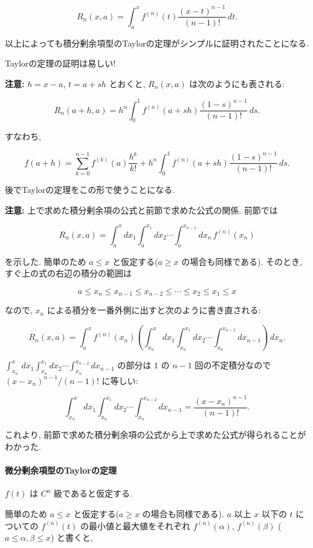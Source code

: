 \documentclass[
  letterpaper,
  DIV=11,
  numbers=noendperiod]{scrartcl}
\let\oldparagraph\paragraph
\renewcommand{\paragraph}[1]{\oldparagraph{#1}\mbox{}}
\begin{document}
\[
R_n(x,a) = \int_a^x f^{(n)}(t)\frac{(x-t)^{n-1}}{(n-1)!}\,dt.
\]

以上によっても積分剰余項型のTaylorの定理がシンプルに証明されたことになる.

Taylorの定理の証明は易しい!

\textbf{注意:} \(h = x - a\), \(t = a + sh\) とおくと, \(R_n(x,a)\)
は次のようにも表される:

\[
R_n(a+h, a) = h^n\int_0^1 f^{(n)}(a + sh)\frac{(1-s)^{n-1}}{(n-1)!}\,ds.
\]

すなわち,

\[
f(a+h) =
\sum_{k=0}^{n-1} f^{(k)}(a)\frac{h^k}{k!} +
h^n\int_0^1 f^{(n)}(a + sh)\frac{(1-s)^{n-1}}{(n-1)!}\,ds.
\]

後でTaylorの定理をこの形で使うことになる.

\textbf{注意:} 上で求めた積分剰余項の公式と前節で求めた公式の関係.
前節では

\[
R_n(x, a) = \int_a^x dx_1\int_a^{x_1}dx_2\cdots\int_a^{x_{n-1}}dx_n\, f^{(n)}(x_n)
\]

を示した. 簡単のため \(a\le x\) と仮定する(\(a \ge x\)
の場合も同様である). そのとき, すぐ上の式の右辺の積分の範囲は

\[
a \le x_n \le x_{n-1}\le x_{n-2}\le\cdots\le x_2 \le x_1 \le x
\]

なので, \(x_n\) による積分を一番外側に出すと次のように書き直される:

\[
R_n(x, a) =
\int_a^x f^{(n)}(x_n)
\left(
\int_{x_n}^x\,dx_1\int_{x_n}^{x_1}dx_2\cdots\int_{x_n}^{x_{n-2}}dx_{n-1}
\right)\,dx_n.
\]

\(\int_{x_n}^x\,dx_1\int_{x_n}^{x_1}dx_2\cdots\int_{x_n}^{x_{n-2}}dx_{n-1}\)
の部分は \(1\) の \(n-1\) 回の不定積分なので \((x-x_n)^{n-1}/(n-1)!\)
に等しい:

\[
\int_{x_n}^x\,dx_1\int_{x_n}^{x_1}dx_2\cdots\int_{x_n}^{x_{n-2}}dx_{n-1} =
\frac{(x-x_n)^{n-1}}{(n-1)!}.
\]

これより,
前節で求めた積分剰余項の公式から上で求めた公式が得られることがわかった.

\hypertarget{ux5faeux5206ux5270ux4f59ux9805ux578bux306etaylorux306eux5b9aux7406}{%
\paragraph{微分剰余項型のTaylorの定理}\label{ux5faeux5206ux5270ux4f59ux9805ux578bux306etaylorux306eux5b9aux7406}}

\(f(t)\) は \(C^n\) 級であると仮定する.

簡単のため \(a\le x\) と仮定する(\(a\ge x\) の場合も同様である). \(a\)
以上 \(x\) 以下の \(t\) についての \(f^{(n)}(t)\)
の最小値と最大値をそれぞれ \(f^{(n)}(\alpha)\), \(f^{(n)}(\beta)\)
(\(a\le\alpha,\beta\le x\)) と書くと,
\end{document}
